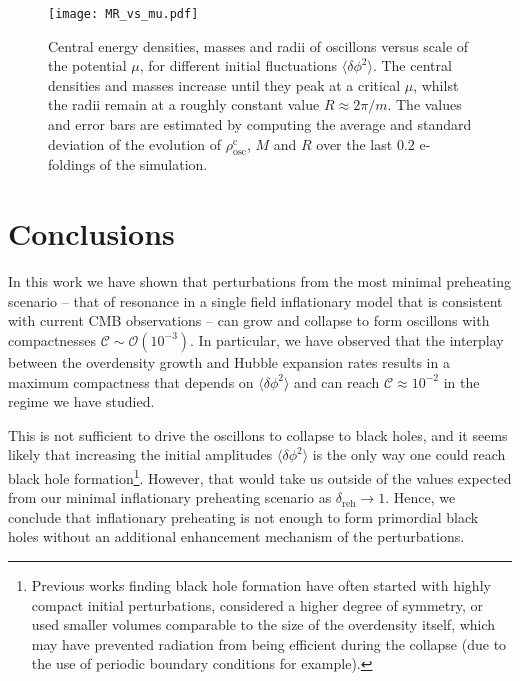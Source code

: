 \documentclass[
    reprint,
    preprintnumbers,
    superscriptaddress,
    nofootinbib,
     amsmath,amssymb,
     aps,
     prd,
    floatfix,
    ]{revtex4-2}
\newcommand{\rhocosc}{\rho^\mathrm{c}_\mathrm{osc}}
\newcommand{\deltaini}{\delta_\mathrm{reh}}
\begin{document}
\begin{figure}[t!]
    \centering
    \texttt{[image: MR\_vs\_mu.pdf]}
\caption{Central energy densities, masses and radii of oscillons versus scale of the potential $\mu$, for different initial fluctuations $\langle \delta\phi^2 \rangle$. The central densities and masses increase until they peak at a critical $\mu$, whilst the radii remain at a roughly constant value $R\approx 2\pi/m$. The values and error bars are estimated by computing the average and standard deviation of the evolution of $\rhocosc$, $M$ and $R$ over the last $0.2$ e-foldings of the simulation.}
\label{fig:MR_comparison}
\end{figure}

\section{Conclusions}
\label{sec:conclusion}

In this work we have shown that perturbations from the most minimal preheating scenario -- that of resonance in a single field inflationary model that is consistent with current CMB observations -- can grow and collapse to form oscillons with compactnesses $\mathcal{C}\sim \mathcal{O}(10^{-3})$. In particular, we have observed that the interplay between the overdensity growth and Hubble expansion rates results in a maximum compactness that depends on $\langle\delta\phi^2\rangle$ and can reach $\mathcal{C}\approx 10^{-2}$ in the regime we have studied. 


This is not sufficient to drive the oscillons to collapse to black holes, and it seems likely that increasing the initial amplitudes $\langle\delta\phi^2\rangle$ is the only way one could reach black hole formation\footnote{Previous works finding black hole formation \cite{Helfer:2016ljl, Michel:2018nzt, Widdicombe:2018oeo, Muia:2019coe, Nazari:2020fmk} have often started with highly compact initial perturbations, considered a higher degree of symmetry, or used smaller volumes comparable to the size of the overdensity itself, which may have prevented radiation from being efficient during the collapse (due to the use of periodic boundary conditions for example).}. However, that would take us outside of the values expected from our minimal inflationary preheating scenario as $\deltaini\rightarrow 1$. Hence, we conclude that inflationary preheating is not enough to form primordial black holes without an additional enhancement mechanism of the perturbations.
\end{document}
